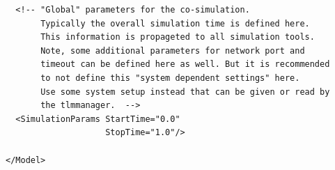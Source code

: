 {\begin{verbatim}
  <!-- "Global" parameters for the co-simulation. 
       Typically the overall simulation time is defined here.
       This information is propageted to all simulation tools. 
       Note, some additional parameters for network port and 
       timeout can be defined here as well. But it is recommended 
       to not define this "system dependent settings" here.
       Use some system setup instead that can be given or read by 
       the tlmmanager.  -->
  <SimulationParams StartTime="0.0" 
                    StopTime="1.0"/>
  
</Model>
\end{verbatim}
}
